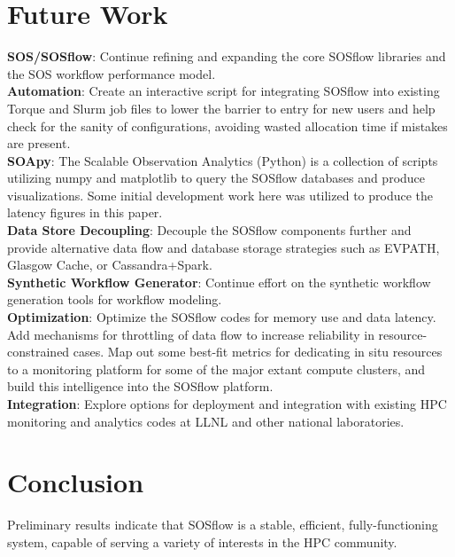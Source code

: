 

\section{Future Work} %
%
\textbf{SOS/SOSflow}: Continue refining and expanding the core SOSflow
libraries and the SOS workflow performance model.
\\
\textbf{Automation}: Create an interactive script for integrating
SOSflow into existing Torque and Slurm job files to lower the barrier
to entry for new users and help check for the sanity of configurations,
avoiding wasted allocation time if mistakes are present.
\\
\textbf{SOApy}: The Scalable Observation Analytics (Python) is a
collection of scripts utilizing numpy and matplotlib to query the
SOSflow databases and produce visualizations. Some initial development
work here was utilized to produce the latency figures in this paper.
\\
\textbf{Data Store Decoupling}: Decouple the
SOSflow components further and provide alternative data flow and
database storage strategies such as EVPATH, Glasgow Cache, or
Cassandra+Spark.
\\
\textbf{Synthetic Workflow Generator}: Continue effort on the 
synthetic workflow generation tools for workflow modeling.
\\
\textbf{Optimization}: Optimize the SOSflow codes for memory use
and data latency. Add mechanisms for throttling of data flow to
increase reliability in resource-constrained cases. Map out some
best-fit metrics for dedicating in situ resources to a monitoring
platform for some of the major extant compute clusters, and build this
intelligence into the SOSflow platform.
\\
\textbf{Integration}: Explore options for deployment and integration with
existing HPC monitoring and analytics codes at LLNL and other
national laboratories.
%
%

\section{Conclusion}
%
Preliminary results indicate that SOSflow is a stable, efficient,
fully-functioning system, capable of serving a variety of interests in
the HPC community. 



